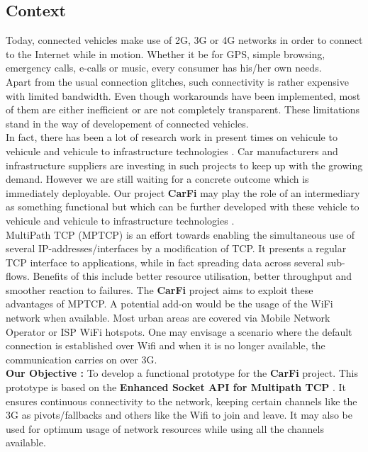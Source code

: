 \documentclass[a4paper,11pt]{article}
\begin{document}
		\subsection{Context}
			\begin{description}
				\item \hspace{2cm} Today, connected vehicles make use of 2G, 3G or 4G networks in order to connect to the Internet while in motion. Whether it be for GPS, simple browsing, emergency calls, e-calls or music, every consumer has his/her own needs. \\

				Apart from the usual connection glitches, such connectivity is rather expensive with limited bandwidth. Even though workarounds have been implemented, most of them are either inefficient or are not completely transparent. These limitations stand in the way of developement of connected vehicles. \\

				In fact, there has been a lot of research work in present times on vehicule to vehicule and vehicule to infrastructure technologies \cite[V2x]{V2I}. Car manufacturers and infrastructure suppliers are investing in such projects to keep up with the growing demand. However we are still waiting for a concrete outcome which is immediately deployable. Our project \textbf{CarFi} may play the role of an intermediary as something functional but which can be further developed with these vehicle to vehicule and vehicule to infrastructure technologies \cite[V2x]{V2x, smartcities}. \\

				MultiPath TCP (MPTCP) is an effort towards enabling the simultaneous use of several IP-addresses/interfaces by a modification of TCP. It presents a regular TCP interface to applications, while in fact spreading data across several sub-flows. Benefits of this include better resource utilisation, better throughput and smoother reaction to failures. The \textbf{CarFi} project aims to exploit these advantages of MPTCP. A potential add-on would be the usage of the WiFi network when available. Most urban areas are covered via Mobile Network Operator or ISP WiFi hotspots. One may envisage a scenario where the default connection is established over Wifi and when it is no longer available, the communication carries on over 3G. \\

				\textbf{Our Objective :} To develop a functional prototype for the \textbf{CarFi} project. This prototype is based on the \textbf{Enhanced Socket API for Multipath TCP} \cite[API]{api}. It ensures continuous connectivity to the network, keeping certain channels like the 3G as pivots/fallbacks and others like the Wifi to join and leave. It may also be used for optimum usage of network resources while using all the channels available.
				
			\end{description}
	
\end{document}
